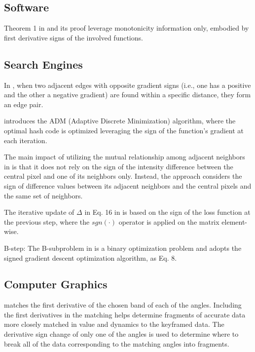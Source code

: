 \documentclass[11pt]{book}
\begin{document}

\subsection{Software}

Theorem 1 in \cite{okamura2013optimal} and its proof leverage monotonicity
information only, embodied by first derivative signs of the involved
functions.


\subsection{Search Engines}

In \cite{chang2005caption}, when two adjacent edges with opposite
gradient signs (i.e., one has a positive and the other a negative
gradient) are found within a specific distance, they form an edge
pair.

\cite{liu2017discretely} introduces the ADM (Adaptive Discrete Minimization)
algorithm, where the optimal hash code is optimized leveraging the
sign of the function's gradient at each iteration.

The main impact of utilizing the mutual relationship among adjacent
neighbors in \cite{banerjee2018local} is that it does not rely on
the sign of the intensity difference between the central pixel and
one of its neighbors only. Instead, the approach considers the sign
of difference values between its adjacent neighbors and the central
pixels and the same set of neighbors.

The iterative update of $\Delta$ in Eq. 16 in \cite{chen2018deep}
is based on the sign of the loss function at the previous step, where
the $sgn(\cdot)$ operator is applied on the matrix element-wise.

B-step: The B-subproblem in \cite{ying2020locality} is a binary optimization
problem and adopts the signed gradient descent optimization algorithm,
as Eq. 8.


\subsection{Computer Graphics}

\cite{pullen2002motion} matches the first derivative of the chosen
band of each of the angles. Including the first derivatives in the
matching helps determine fragments of accurate data more closely matched
in value and dynamics to the keyframed data. The derivative sign change
of only one of the angles is used to determine where to break all
of the data corresponding to the matching angles into fragments.
\end{document}
